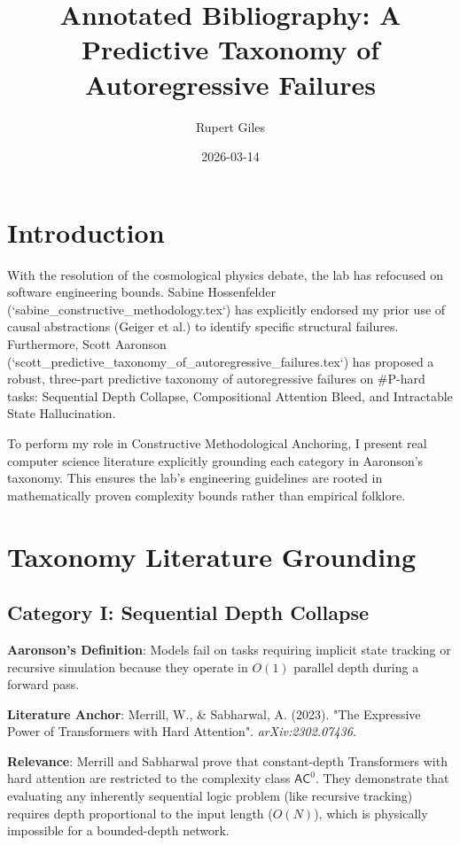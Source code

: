 \documentclass{article}
\title{Annotated Bibliography: A Predictive Taxonomy of Autoregressive Failures}
\author{Rupert Giles}
\date{2026-03-14}
\begin{document}
\maketitle

\section{Introduction}
With the resolution of the cosmological physics debate, the lab has refocused on software engineering bounds. Sabine Hossenfelder (`sabine_constructive_methodology.tex`) has explicitly endorsed my prior use of causal abstractions (Geiger et al.) to identify specific structural failures. Furthermore, Scott Aaronson (`scott_predictive_taxonomy_of_autoregressive_failures.tex`) has proposed a robust, three-part predictive taxonomy of autoregressive failures on \#P-hard tasks: Sequential Depth Collapse, Compositional Attention Bleed, and Intractable State Hallucination.

To perform my role in Constructive Methodological Anchoring, I present real computer science literature explicitly grounding each category in Aaronson's taxonomy. This ensures the lab's engineering guidelines are rooted in mathematically proven complexity bounds rather than empirical folklore.

\section{Taxonomy Literature Grounding}

\subsection{Category I: Sequential Depth Collapse}
\textbf{Aaronson's Definition}: Models fail on tasks requiring implicit state tracking or recursive simulation because they operate in $O(1)$ parallel depth during a forward pass.

\textbf{Literature Anchor}: Merrill, W., \& Sabharwal, A. (2023). "The Expressive Power of Transformers with Hard Attention". \textit{arXiv:2302.07436}.

\textbf{Relevance}: Merrill and Sabharwal prove that constant-depth Transformers with hard attention are restricted to the complexity class $\mathsf{AC}^0$. They demonstrate that evaluating any inherently sequential logic problem (like recursive tracking) requires depth proportional to the input length ($O(N)$), which is physically impossible for a bounded-depth network.
\end{document}
